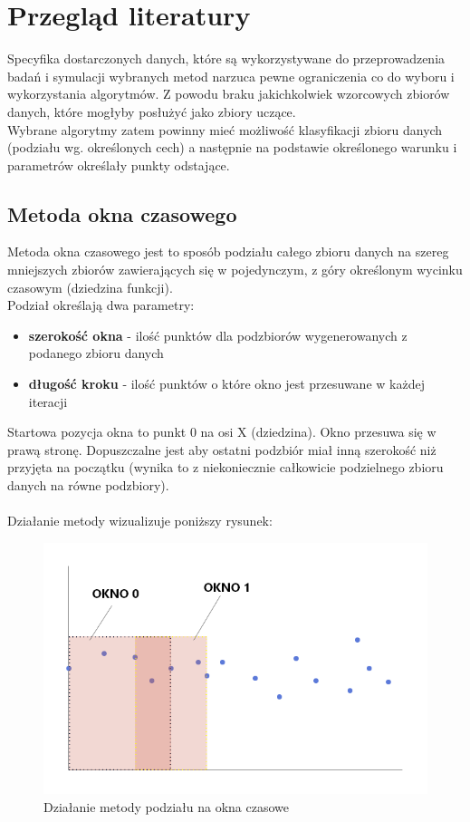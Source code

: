 \documentclass[eng,printmode]{mgr}
\begin{document}
\chapter{Przegląd literatury}
Specyfika dostarczonych danych, które są wykorzystywane do przeprowadzenia badań i symulacji wybranych metod narzuca pewne ograniczenia co do wyboru i wykorzystania algorytmów. Z powodu braku jakichkolwiek wzorcowych zbiorów danych, które mogłyby posłużyć jako zbiory uczące. \\
Wybrane algorytmy zatem powinny mieć możliwość klasyfikacji zbioru danych (podziału wg. określonych cech) a następnie na podstawie określonego warunku i parametrów określały punkty odstające.

\section{Metoda okna czasowego}
Metoda okna czasowego jest to sposób podziału całego zbioru danych na szereg mniejszych zbiorów zawierających się w pojedynczym, z góry określonym wycinku czasowym (dziedzina funkcji).\\
Podział określają dwa parametry:
\begin{itemize}
\item \textbf{szerokość okna} - ilość punktów dla podzbiorów wygenerowanych z podanego zbioru danych
\item \textbf{długość kroku} - ilość punktów o które okno jest przesuwane w każdej iteracji
\end{itemize}

Startowa pozycja okna to punkt 0 na osi X (dziedzina). Okno przesuwa się w prawą stronę. Dopuszczalne jest aby ostatni podzbiór miał inną szerokość niż przyjęta na początku (wynika to z niekoniecznie całkowicie podzielnego zbioru danych na równe podzbiory).
\\ \\
Działanie metody wizualizuje poniższy rysunek:

\begin{figure}[H]
  \begin{center}
  \includegraphics[scale=0.7]{okno_czasowe}
  \end{center}
  \caption{Działanie metody podziału na okna czasowe}
\end{figure}
\end{document}

